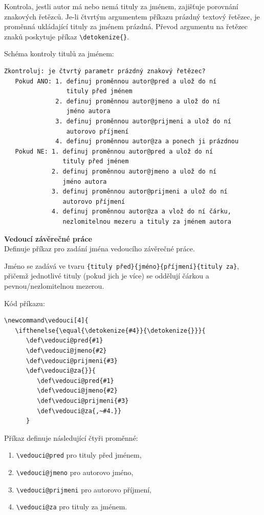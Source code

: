Kontrola, jestli autor má nebo nemá tituly za jménem, zajišťuje porovnání znakových řetězců. Je-li čtvrtým argumentem příkazu prázdný textový řetězec, je proměnná ukládající tituly za jménem prázdná. Převod argumentu na řetězec znaků poskytuje příkaz \verb|\detokenize{}|.

Schéma kontroly titulů za jménem:

\begin{verbatim}
Zkontroluj: je čtvrtý parametr prázdný znakový řetězec?
   Pokud ANO: 1. definuj proměnnou autor@pred a ulož do ní
                 tituly před jménem
              2. definuj proměnnou autor@jmeno a ulož do ní
                 jméno autora
              3. definuj proměnnou autor@prijmeni a ulož do ní
                 autorovo příjmení
              4. definuj proměnnou autor@za a ponech ji prázdnou
   Pokud NE: 1. definuj proměnnou autor@pred a ulož do ní
                tituly před jménem
             2. definuj proměnnou autor@jmeno a ulož do ní
                jméno autora
             3. definuj proměnnou autor@prijmeni a ulož do ní
                autorovo příjmení
             4. definuj proměnnou autor@za a vlož do ní čárku,
                nezlomitelnou mezeru a tituly za jménem autora
\end{verbatim}

\newpage
\textbf{Vedoucí závěrečné práce}\\
Definuje příkaz pro zadání jména vedoucího závěrečné práce.

Jméno se zadává ve tvaru \verb|{tituly před}{jméno}{příjmení}{tituly za}|, přičemž jednotlivé tituly (pokud jich je více) se oddělují čárkou a pevnou/nezlomitelnou mezerou.

Kód příkazu:

\begin{verbatim}
\newcommand\vedouci[4]{
   \ifthenelse{\equal{\detokenize{#4}}{\detokenize{}}}{
      \def\vedouci@pred{#1}
      \def\vedouci@jmeno{#2}
      \def\vedouci@prijmeni{#3}
      \def\vedouci@za{}}{
         \def\vedouci@pred{#1}
         \def\vedouci@jmeno{#2}
         \def\vedouci@prijmeni{#3}
         \def\vedouci@za{,~#4.}}
      }
\end{verbatim}

Příkaz definuje následující čtyři proměnné:

\begin{enumerate}
	\item \verb|\vedouci@pred| pro tituly před jménem,
	\item \verb|\vedouci@jmeno| pro autorovo jméno,
	\item \verb|\vedouci@prijmeni| pro autorovo příjmení,
	\item \verb|\vedouci@za| pro tituly za jménem.
\end{enumerate}

